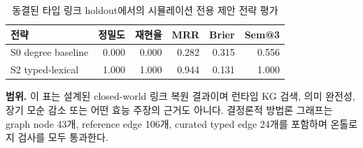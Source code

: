 \begin{table}[t]
\centering
\small
\renewcommand{\arraystretch}{1.20}
\caption{동결된 타입 링크 holdout에서의 시뮬레이션 전용 제안 전략 평가}
\label{tab:kg-ontology-simulation}
\begin{tabular}{lrrrrr}
\toprule
전략 & 정밀도 & 재현율 & MRR & Brier & Sem@3 \\
\midrule
S0 degree baseline & 0.000 & 0.000 & 0.282 & 0.315 & 0.556 \\
S2 typed-lexical & 1.000 & 1.000 & 0.944 & 0.131 & 1.000 \\
\bottomrule
\end{tabular}
\end{table}
\noindent\textbf{범위.} 이 표는 설계된 closed-world 링크 복원 결과이며 런타임 KG 검색, 의미 완전성, 장기 모순 감소 또는 어떤 효능 주장의 근거도 아니다.
\noindent 결정론적 방법론 그래프는 graph node 43개, reference edge 106개, curated typed edge 24개를 포함하며 온톨로지 검사를 모두 통과한다.
